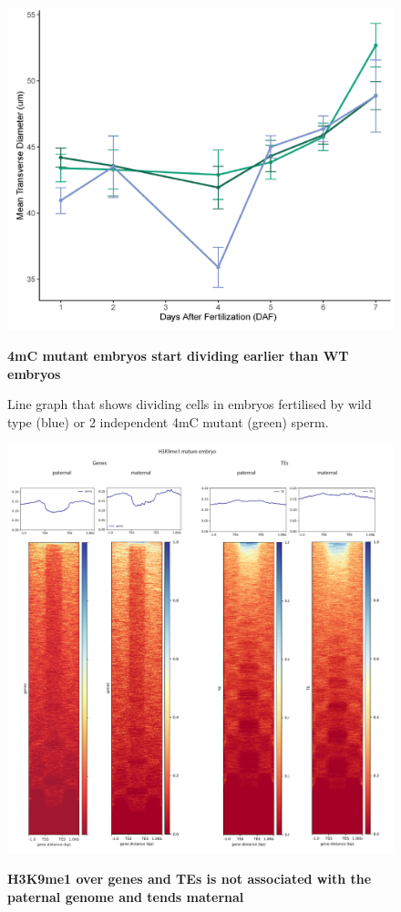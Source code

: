 \begin{figure}[htbp!] 
\centering    
    \includegraphics[width=1\textwidth]{Chapter3/Figs/Supps/FigureS4_transverse_diameter.pdf}
\caption{\textbf{4mC mutant embryos start dividing earlier than WT embryos}}
\label{fig:Dividing_cells}
\captionsetup{font=small}
    \caption*{Line graph that shows dividing cells in embryos fertilised by wild type (blue) or 2 independent 4mC mutant (green) sperm.}
\end{figure}

\begin{figure}[htbp!] 
\centering    
    \includegraphics[width=1\textwidth]{Chapter3/Figs/Supps/FigureS5_H3k9me1.pdf}
\caption{\textbf{H3K9me1 over genes and TEs is not associated with the paternal genome and tends maternal}}
\label{fig:h3k8me1}
\captionsetup{font=small}
    \caption*{}
\end{figure}

